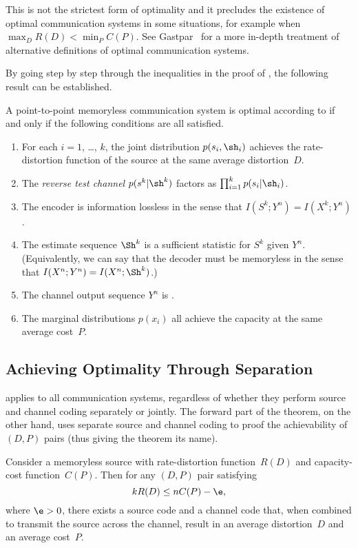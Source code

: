 This is not the strictest form of optimality and it precludes the existence of
optimal communication systems in some situations, for example when $\max_D R(D)
< \min_P C(P)$. See Gastpar~\cite{GastparThesis} for a more in-depth treatment
of alternative definitions of optimal communication systems.

By going step by step through the inequalities in the proof of
, the following result can be established. 

\begin{theorem}
  \label{thm:optimalityconditions}
  A point-to-point memoryless communication system is optimal according to
   if and only if the following conditions are all satisfied.
  \begin{enumerate}
    \item For each $i = 1$, \dots, $k$, the joint distribution $p(s_i,\sh_i)$
      achieves the rate-distortion function of the source at the same average
      distortion~$D$.
    \item The \emph{reverse test channel} $p(s^k|\sh^k)$ factors as
      $\prod_{i=1}^k p(s_i | \sh_i)$. 
    \item The encoder is information lossless in the sense that $I(S^k;Y^n) =
      I(X^k; Y^n)$. 
    \item The estimate sequence $\Sh^k$ is a sufficient statistic for $S^k$
      given $Y^n$. (Equivalently, we can say that the decoder must be memoryless
      in the sense that $I(X^n;Y^n) = I(X^n;\Sh^k)$.)
    \item The channel output sequence $Y^n$ is \iid.
    \item The marginal distributions $p(x_i)$ all achieve the capacity at the
      same average cost~$P$.
  \end{enumerate}
\end{theorem}


\subsection{Achieving Optimality Through Separation}

 applies to all communication systems, regardless of
whether they perform source and channel coding separately or jointly. The
forward part of the theorem, on the other hand, uses separate source and channel
coding to proof the achievability of $(D,P)$ pairs (thus giving the theorem its
name).

\begin{theorem}
  \label{thm:separationforward}
  Consider a memoryless source with rate-distortion function~$R(D)$ and
  capacity-cost function~$C(P)$. Then for any $(D,P)$ pair satisfying
  \begin{equation*}
    kR(D) \le n C(P) - \e,
  \end{equation*}
  where $\e > 0$, there exists a source code and a channel code that, when
  combined to transmit the source across the channel, result in an average
  distortion~$D$ and an average cost~$P$.
\end{theorem}

